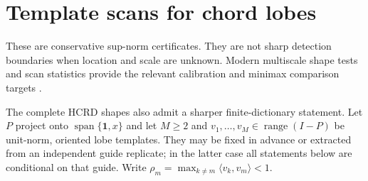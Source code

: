 \section{Template scans for chord lobes}

These are conservative sup-norm certificates.  They are not sharp detection
boundaries when location and scale are unknown.  Modern multiscale shape tests
and scan statistics provide the relevant calibration and minimax comparison
targets \citep{dumbgen2001multiscale,ariascastro2005geometric,
sharpnack2018scan}.

The complete HCRD shapes also admit a sharper finite-dictionary statement.
Let $P$ project onto $\operatorname{span}\{\mathbf 1,x\}$ and let $M\ge2$ and
$v_1,\ldots,v_M\in\operatorname{range}(I-P)$ be unit-norm, oriented lobe
templates.  They may be fixed in advance or extracted from an independent
guide replicate; in the latter case all statements below are conditional on
that guide.  Write $\rho_m=\max_{k\ne m}\langle v_k,v_m\rangle<1$.

